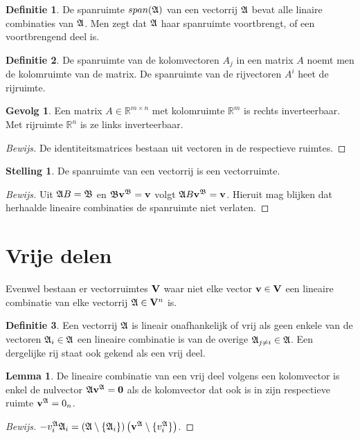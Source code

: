 \documentclass{amsart}
\theoremstyle{definition}
\newtheorem{thm}{Stelling}[section]
\newtheorem{lmm}{Lemma}[section]
\newtheorem{dfn}{Definitie}[section]
\newtheorem{csq}{Gevolg}[section]
\newenvironment{bewijs}{\begin{proof}[Bewijs]}{\end{proof}}
\newcommand{\setsm}[1]{\{{#1}\}}
\newcommand{\without}[1]{\setminus\setsm{#1}}
\newcommand{\realnums}{\mathbb{R}}
\newcommand{\realn}[1][n]{\realnums^{#1}}
\newcommand{\realmx}[2][n]{\realn[#2 \times #1]}
\newcommand{\realmxn}{\realmx{m}}
\newcommand{\vecspace}[1][v]{\mathrm{\mathbf{\MakeUppercase#1}}}
\newcommand{\vecspacen}[1][n]{\vecspace^#1}
\newcommand{\vvec}[1][v]{\mathbf{#1}}
\newcommand{\zerovec}{\vvec[0]}
\newcommand{\vecrow}[1][a]{\mathfrak{\MakeUppercase{#1}}}
\newcommand{\rvec}[2][i]{{#2}_{#1}}
\newcommand{\rvecr}[2][i]{\rvec[#1]{\vecrow[#2]}}
\newcommand{\rveci}[1][i]{\rvecr[#1]{a}}
\newcommand{\cvec}[2]{{#1}^{#2}}
\newcommand{\cvecv}[2][v]{\cvec{\vvec[#1]}{#2}}
\newcommand{\cvecva}[1][a]{\cvecv{\vecrow[#1]}}
\newcommand{\cvecc}[2][a]{\cvecv[#2]{\vecrow[#1]}}
\newcommand{\cvecvv}[1][v]{\cvecc{#1}}
\newcommand{\vcord}[3]{{#1}_{#2}^{#3}}
\newcommand{\vcordv}[3][v]{\vcord{#1}{#2}{\vecrow[#3]}}
\newcommand{\vcordvi}[2][i]{\vcordv{#1}{#2}}
\newcommand{\vcordvia}[1][i]{\vcordvi[#1]{a}}
\begin{document}
\begin{dfn}
	De spanruimte $span(\vecrow)$ van een vectorrij $\vecrow$ bevat alle linaire combinaties van $\vecrow$.
	Men zegt dat $\vecrow$ haar spanruimte voortbrengt, of een voortbrengend deel is.
\end{dfn}

\begin{dfn}
	De spanruimte van de kolomvectoren $A_j$ in een matrix $A$ noemt men de kolomruimte van de matrix.
	De spanruimte van de rijvectoren $A^i$ heet de rijruimte.
\end{dfn}

\begin{csq}
	Een matrix $A \in \realmxn$ met kolomruimte $\realn[m]$ is rechts inverteerbaar.
	Met rijruimte $\realn$ is ze links inverteerbaar.
	\begin{bewijs}
		De identiteitsmatrices bestaan uit vectoren in de respectieve ruimtes.
	\end{bewijs}
\end{csq}

\begin{thm}
	De spanruimte van een vectorrij is een vectorruimte.
	\begin{bewijs}
		Uit $\vecrow B = \vecrow[b]$ en $\vecrow[b] \cvecva[b]= \vvec$ volgt $\vecrow B \cvecva[b] = \vvec$.
		Hieruit mag blijken dat herhaalde lineaire combinaties de spanruimte niet verlaten.
	\end{bewijs}
\end{thm}

\section{Vrije delen}

Evenwel bestaan er vectorruimtes $\vecspace$ waar niet elke vector $\vvec \in \vecspace$ een lineaire combinatie van elke vectorrij $\vecrow \in \vecspacen$ is.

\begin{dfn}
	Een vectorrij $\vecrow$ is lineair onafhankelijk of vrij als geen enkele van de vectoren $\vecrow_i \in \vecrow$ een lineaire combinatie is van de overige $\vecrow_{j\neq i} \in \vecrow$.
	Een dergelijke rij staat ook gekend als een vrij deel.
\end{dfn}

\begin{lmm}
	De lineaire combinatie van een vrij deel volgens een kolomvector is enkel de nulvector $\vecrow \cvecvv = \zerovec$ als de kolomvector dat ook is in zijn respectieve ruimte $\cvecvv = 0_n$.
	\begin{bewijs}
		$-\vcordvia \vecrow_i = \left(\vecrow \without{\rveci}\right)\left(\cvecvv \without{\vcordvia}\right)$.
	\end{bewijs}
\end{lmm}
\end{document}
